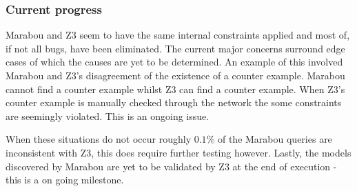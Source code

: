 \documentclass[a4paper,parskip=half]{scrartcl}
\begin{document}
\subsubsection{Current progress}

Marabou and Z3 seem to have the same internal constraints applied and most of, if not all bugs, have been eliminated. The current major concerns surround edge cases of which the causes are yet to be determined. An example of this involved Marabou and Z3's disagreement of the existence of a counter example. Marabou cannot find a counter example whilst Z3 can find a counter example. When Z3's counter example is manually checked through the network the some constraints are seemingly violated. This is an ongoing issue. 

When these situations do not occur roughly $0.1 \%$ of the Marabou queries are inconsistent with Z3, this does require further testing however. Lastly, the models discovered by Marabou are yet to be validated by Z3 at the end of execution - this is a on going milestone.
\end{document}
